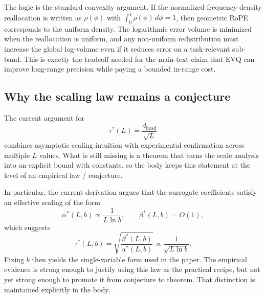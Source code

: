 The logic is the standard convexity argument. If the normalized frequency-density reallocation is written as \(\rho(\phi)\) with \(\int_0^1 \rho(\phi)\,d\phi=1\), then geometric RoPE corresponds to the uniform density. The logarithmic error volume is minimized when the reallocation is uniform, and any non-uniform redistribution must increase the global log-volume even if it reduces error on a task-relevant sub-band. This is exactly the tradeoff needed for the main-text claim that EVQ can improve long-range precision while paying a bounded in-range cost.

\subsection{Why the scaling law remains a conjecture}

The current argument for
\begin{equation}
\tau^*(L)=\frac{d_{\mathrm{head}}}{\sqrt{L}}
\end{equation}
combines asymptotic scaling intuition with experimental confirmation across multiple \(L\) values. What is still missing is a theorem that turns the scale analysis into an explicit bound with constants, so the body keeps this statement at the level of an empirical law / conjecture.

In particular, the current derivation argues that the surrogate coefficients satisfy an effective scaling of the form
\begin{equation}
\alpha^*(L,b)\propto \frac{1}{L\ln b},
\qquad
\beta^*(L,b)=O(1),
\end{equation}
which suggests
\begin{equation}
\tau^*(L,b)=\sqrt{\frac{\beta^*(L,b)}{\alpha^*(L,b)}}\propto \frac{1}{\sqrt{L\ln b}}.
\end{equation}
Fixing \(b\) then yields the single-variable form used in the paper. The empirical evidence is strong enough to justify using this law as the practical recipe, but not yet strong enough to promote it from conjecture to theorem. That distinction is maintained explicitly in the body.
